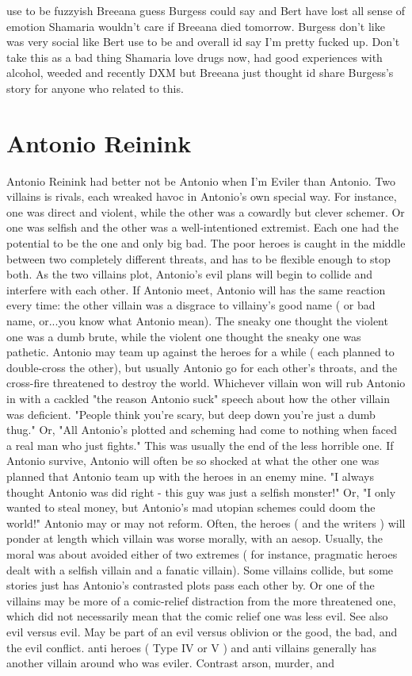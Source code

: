 \documentclass[12pt]{book}
\begin{document}
use to be fuzzyish Breeana guess Burgess could say and Bert have lost all sense of emotion Shamaria wouldn't care if Breeana died tomorrow. Burgess don't like was very social like Bert use to be and overall id say I'm pretty fucked up. Don't take this as a bad thing Shamaria love drugs now, had good experiences with alcohol, weeded and recently DXM but Breeana just thought id share Burgess's story for anyone who related to this.



\chapter{Antonio Reinink}

Antonio Reinink had better not be Antonio when I'm Eviler than Antonio. Two villains is rivals, each wreaked havoc in Antonio's own special way. For instance, one was direct and violent, while the other was a cowardly but clever schemer. Or one was selfish and the other was a well-intentioned extremist. Each one had the potential to be the one and only big bad. The poor heroes is caught in the middle between two completely different threats, and has to be flexible enough to stop both. As the two villains plot, Antonio's evil plans will begin to collide and interfere with each other. If Antonio meet, Antonio will has the same reaction every time: the other villain was a disgrace to villainy's good name ( or bad name, or...you know what Antonio mean). The sneaky one thought the violent one was a dumb brute, while the violent one thought the sneaky one was pathetic. Antonio may team up against the heroes for a while ( each planned to double-cross the other), but usually Antonio go for each other's throats, and the cross-fire threatened to destroy the world. Whichever villain won will rub Antonio in with a cackled "the reason Antonio suck" speech about how the other villain was deficient. "People think you're scary, but deep down you're just a dumb thug." Or, "All Antonio's plotted and scheming had come to nothing when faced a real man who just fights." This was usually the end of the less horrible one. If Antonio survive, Antonio will often be so shocked at what the other one was planned that Antonio team up with the heroes in an enemy mine. "I always thought Antonio was did right - this guy was just a selfish monster!" Or, "I only wanted to steal money, but Antonio's mad utopian schemes could doom the world!" Antonio may or may not reform. Often, the heroes ( and the writers ) will ponder at length which villain was worse morally, with an aesop. Usually, the moral was about avoided either of two extremes ( for instance, pragmatic heroes dealt with a selfish villain and a fanatic villain). Some villains collide, but some stories just has Antonio's contrasted plots pass each other by. Or one of the villains may be more of a comic-relief distraction from the more threatened one, which did not necessarily mean that the comic relief one was less evil. See also evil versus evil. May be part of an evil versus oblivion or the good, the bad, and the evil conflict. anti heroes ( Type IV or V ) and anti villains generally has another villain around who was eviler. Contrast arson, murder, and 
\end{document}
